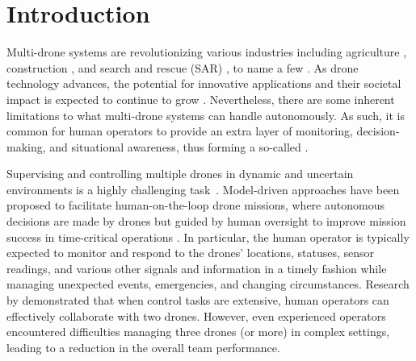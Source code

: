 \section{Introduction}
\label{Introduction}

Multi-drone systems are revolutionizing various industries including agriculture \cite{tsouros2019review}, construction \cite{sai2022survey}, and search and rescue (SAR) \cite{lyu2023unmanned}, to name a few \cite{hassanalian2017classifications}. 
As drone technology advances, the potential for innovative applications and their societal impact is expected to continue to grow \cite{tezza2019state}. Nevertheless, there are some inherent limitations to what multi-drone systems can handle autonomously. As such, it is common for human operators to provide an extra layer of monitoring, decision-making, and situational awareness, thus forming a so-called  \cite{rebensky2022teammates,francos2023role}.  

Supervising and controlling multiple drones in dynamic and uncertain environments is a highly challenging task~\cite{nischal2024challenges}. Model-driven approaches have been proposed to facilitate human-on-the-loop drone missions, where autonomous decisions are made by drones but guided by human oversight to improve mission success in time-critical operations \cite{agrawal2020modeldriven}. In particular, the human operator is typically expected to monitor and respond to the drones' locations, statuses, sensor readings, and various other signals and information in a timely fashion while managing unexpected events, emergencies, and changing circumstances. 
Research by \cite{porat2016supervising} demonstrated that when control tasks are extensive, human operators can effectively collaborate with two drones. However, even experienced operators encountered difficulties managing three drones (or more) in complex settings, leading to a reduction in the overall team performance.


